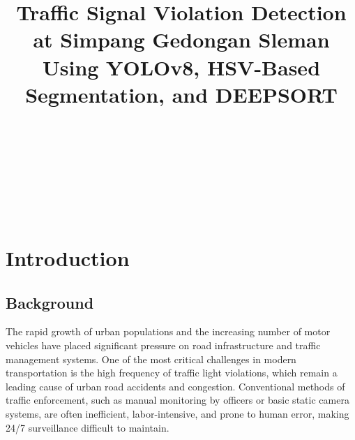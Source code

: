 \documentclass[conference]{IEEEtran}
\begin{document}
\title{Traffic Signal Violation Detection at Simpang Gedongan Sleman Using YOLOv8, HSV-Based Segmentation, and DEEPSORT}

\author{
\\
\and
{}
\\
\and
{}
\\
\and
{}
\\
}

\maketitle


\section{Introduction} 

\subsection{Background}
The rapid growth of urban populations and the increasing number of motor vehicles have placed significant pressure on road infrastructure and traffic management systems. One of the most critical challenges in modern transportation is the high frequency of traffic light violations, which remain a leading cause of urban road accidents and congestion. Conventional methods of traffic enforcement, such as manual monitoring by officers or basic static camera systems, are often inefficient, labor-intensive, and prone to human error, making 24/7 surveillance difficult to maintain.
\end{document}
